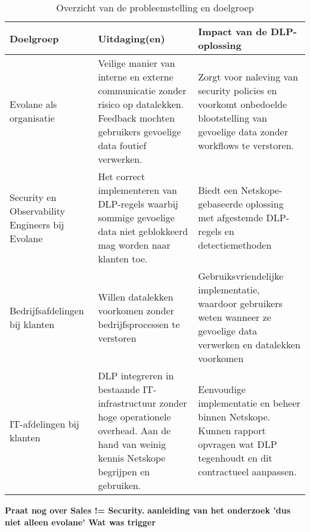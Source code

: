\begin{table}[h]
    \centering
    \small
    \begin{tabular}{p{4cm} p{5cm} p{6cm}}
        \toprule
        \textbf{Doelgroep} & \textbf{Uitdaging(en)} & \textbf{Impact van de DLP-oplossing} \\
        \midrule
        Evolane als organisatie & Veilige manier van interne en externe communicatie zonder risico op datalekken. Feedback mochten gebruikers gevoelige data foutief verwerken. & Zorgt voor naleving van security policies en voorkomt onbedoelde blootstelling van gevoelige data zonder workflows te verstoren. \\
        Security en Observability Engineers bij Evolane & Het correct implementeren van DLP-regels waarbij sommige gevoelige data niet geblokkeerd mag worden naar klanten toe. & Biedt een Netskope-gebaseerde oplossing met afgestemde DLP-regels en detectiemethoden \\ 
        Bedrijfsafdelingen bij klanten & Willen datalekken voorkomen zonder bedrijfsprocessen te verstoren & Gebruiksvriendelijke implementatie, waardoor gebruikers weten wanneer ze gevoelige data verwerken en datalekken voorkomen \\
        IT-afdelingen bij klanten & DLP integreren in bestaande IT-infrastructuur zonder hoge operationele overhead. Aan de hand van weinig kennis Netskope begrijpen en gebruiken. & Eenvoudige implementatie en beheer binnen Netskope. Kunnen rapport opvragen wat DLP tegenhoudt en dit contractueel aanpassen. \\
        \bottomrule
    \end{tabular}
    \caption{Overzicht van de probleemstelling en doelgroep}
    \label{tab:probleemstelling}
\end{table}

\textbf{Praat nog over Sales != Security.}
\textbf{aanleiding van het onderzoek 'dus niet alleen evolane' Wat was trigger} 

